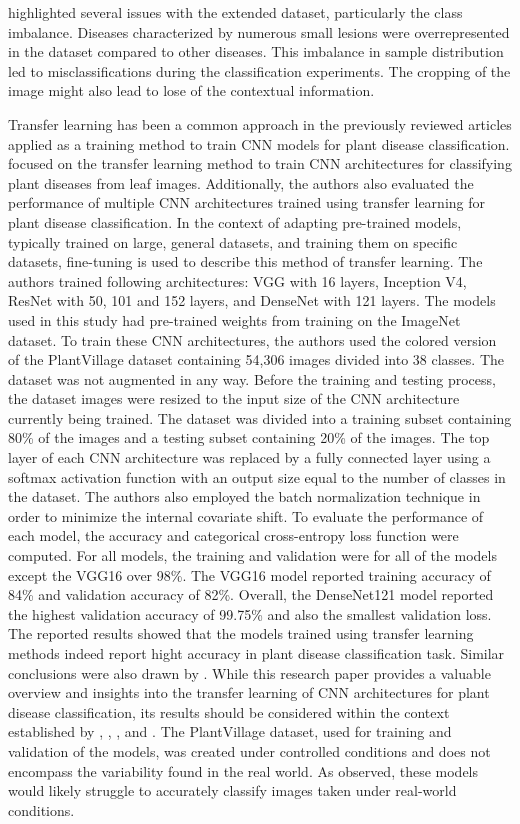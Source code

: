 \documentclass{BachelorBUI}
\begin{document}
highlighted several issues with the extended dataset, particularly the class imbalance. Diseases characterized by numerous small lesions were overrepresented in the dataset compared to other diseases. This imbalance in sample distribution led to misclassifications during the classification experiments. The cropping of the image might also lead to lose of the contextual information.

Transfer learning has been a common approach in the previously reviewed articles applied as a training method to train CNN models for plant disease classification. \textcite{Too:2019} focused on the transfer learning method to train CNN architectures for classifying plant diseases from leaf images. Additionally, the authors also evaluated the performance of multiple CNN architectures trained using transfer learning for plant disease classification. In the context of adapting pre-trained models, typically trained on large, general datasets, and training them on specific datasets, fine-tuning is used to describe this method of transfer learning. The authors trained following architectures: VGG with 16 layers, Inception V4, ResNet with 50, 101 and 152 layers, and DenseNet with 121 layers. The models used in this study had pre-trained weights from training on the ImageNet dataset. To train these CNN architectures, the authors used the colored version of the PlantVillage dataset containing 54,306 images divided into 38 classes. The dataset was not augmented in any way. Before the training and testing process, the dataset images were resized to the input size of the CNN architecture currently being trained. The dataset was divided into a training subset containing 80\% of the images and a testing subset containing 20\% of the images. The top layer of each CNN architecture was replaced by a fully connected layer using a softmax activation function with an output size equal to the number of classes in the dataset. The authors also employed the batch normalization technique in order to minimize the internal covariate shift. To evaluate the performance of each model, the accuracy and categorical cross-entropy loss function were computed. For all models, the training and validation were for all of the models except the VGG16 over 98\%. The VGG16 model reported training accuracy of 84\% and validation accuracy of 82\%. Overall, the DenseNet121 model reported the highest validation accuracy of 99.75\% and also the smallest validation loss. The reported results showed that the models trained using transfer learning methods indeed report hight accuracy in plant disease classification task. Similar conclusions were also drawn by \textcite{Mohanty:2016}. While this research paper provides a valuable overview and insights into the transfer learning of CNN architectures for plant disease classification, its results should be considered within the context established by \cite{Mohanty:2016}, \cite{Barbedo:2018:1}, \cite{Barbedo:2018:2}, and \cite{Barbedo:2019}.  The PlantVillage dataset, used for training and validation of the models, was created under controlled conditions and does not encompass the variability found in the real world. As \textcite{Mohanty:2016} observed, these models would likely struggle to accurately classify images taken under real-world conditions.
\end{document}

